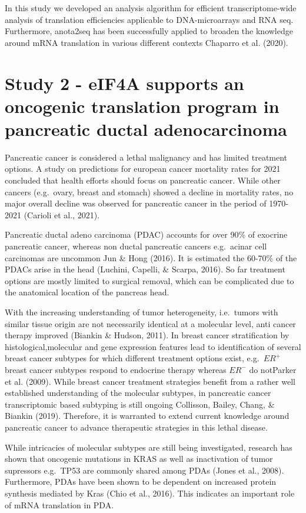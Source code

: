 \documentclass[
  12pt,
  openany]{book}
\begin{document}
In this study we developed an analysis algorithm for efficient transcriptome-wide analysis of translation efficiencies applicable to DNA-microarrays and RNA seq. Furthermore, anota2seq has been successfully applied to broaden the knowledge around mRNA translation in various different contexts Chaparro et al. (2020).

\section{Study 2 - eIF4A supports an oncogenic translation program in pancreatic ductal adenocarcinoma}

Pancreatic cancer is considered a lethal malignancy and has limited treatment options. A study on predictions for european cancer mortality rates for 2021 concluded that health efforts should focus on pancreatic cancer. While other cancers (e.g.~ovary, breast and stomach) showed a decline in mortality rates, no major overall decline was observed for pancreatic cancer in the period of 1970-2021 (Carioli et al., 2021).

Pancreatic ductal adeno carcinoma (PDAC) accounts for over 90\% of exocrine pancreatic cancer, whereas non ductal pancreatic cancers e.g.~acinar cell carcinomas are uncommon Jun \& Hong (2016). It is estimated the 60-70\% of the PDACs arise in the head (Luchini, Capelli, \& Scarpa, 2016). So far treatment options are mostly limited to surgical removal, which can be complicated due to the anatomical location of the pancreas head.

With the increasing understanding of tumor heterogeneity, i.e.~tumors with similar tissue origin are not necessarily identical at a molecular level, anti cancer therapy improved (Biankin \& Hudson, 2011). In breast cancer stratification by histological,molecular and gene expression features lead to identification of several breast cancer subtypes for which different treatment options exist, e.g.~\(ER^+\) breast cancer subtypes respond to endocrine therapy whereas \(ER^-\) do notParker et al. (2009). While breast cancer treatment strategies benefit from a rather well established understanding of the molecular subtypes, in pancreatic cancer transcriptomic based subtyping is still ongoing Collisson, Bailey, Chang, \& Biankin (2019). Therefore, it is warranted to extend current knowledge around pancreatic cancer to advance therapeutic strategies in this lethal disease.

While intricacies of molecular subtypes are still being investigated, research has shown that oncogenic mutations in KRAS as well as inactivation of tumor supressors e.g.~TP53 are commonly shared among PDAs (Jones et al., 2008). Furthermore, PDAs have been shown to be dependent on increased protein synthesis mediated by Kras (Chio et al., 2016). This indicates an important role of mRNA translation in PDA.
\end{document}
